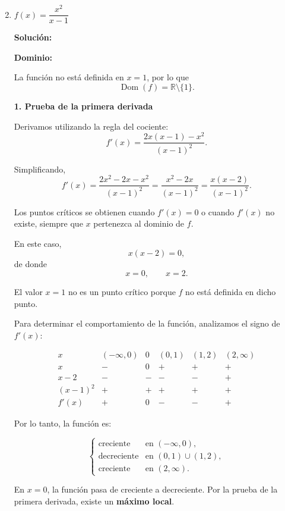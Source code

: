\documentclass[12pt]{article}
\newcommand{\solucion}{%
    \vspace{0.8em}%
    \textbf{Solución:}%
}
\begin{document}
\begin{enumerate}[label=\alph*.-]

    \setcounter{enumi}{1} %

    \item $f(x) = \dfrac{x^2}{x - 1}$

    \solucion

    \textbf{Dominio:}

    La función no está definida en $x=1$, por lo que
    \[
    \operatorname{Dom}(f)=\mathbb{R}\setminus\{1\}.
    \]

    \textbf{1. Prueba de la primera derivada}

    Derivamos utilizando la regla del cociente:
    \[
    f'(x)
    =
    \frac{2x(x-1)-x^2}{(x-1)^2}.
    \]

    Simplificando,
    \[
    f'(x)
    =
    \frac{2x^2-2x-x^2}{(x-1)^2}
    =
    \frac{x^2-2x}{(x-1)^2}
    =
    \frac{x(x-2)}{(x-1)^2}.
    \]

    Los puntos críticos se obtienen cuando $f'(x)=0$ o cuando
    $f'(x)$ no existe, siempre que $x$ pertenezca al dominio de $f$.

    En este caso,
    \[
    x(x-2)=0,
    \]
    de donde
    \[
    x=0,\qquad x=2.
    \]

    El valor $x=1$ no es un punto crítico porque $f$ no está definida
    en dicho punto.

    Para determinar el comportamiento de la función, analizamos el signo
    de $f'(x)$:

    \[
    \begin{array}{c|ccccc}
    x & (-\infty,0) & 0 & (0,1) & (1,2) & (2,\infty)\\
    \hline
    x & - & 0 & + & + & +\\
    x-2 & - & - & - & - & +\\
    (x-1)^2 & + & + & + & + & +\\
    \hline
    f'(x) & + & 0 & - & - & +
    \end{array}
    \]

    Por lo tanto, la función es:

    \[
    \begin{cases}
    \text{creciente} & \text{en }(-\infty,0),\\
    \text{decreciente} & \text{en }(0,1)\cup(1,2),\\
    \text{creciente} & \text{en }(2,\infty).
    \end{cases}
    \]

    En $x=0$, la función pasa de creciente a decreciente. Por la
    prueba de la primera derivada, existe un \textbf{máximo local}.


\end{enumerate}
\end{document}
